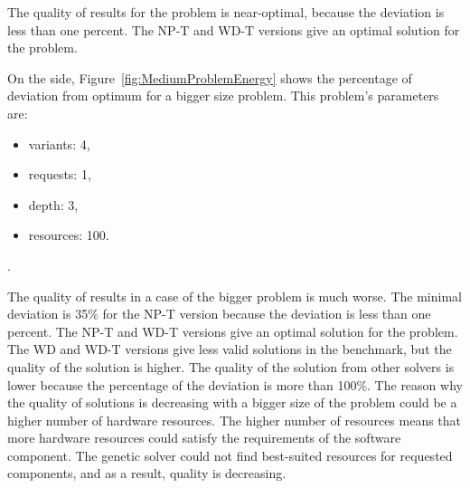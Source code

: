 The quality of results for the problem is near-optimal, because the deviation is less than one percent. The NP-T and WD-T versions give an optimal solution for the problem.

On the side, Figure~\ref{fig:MediumProblemEnergy} shows the percentage of deviation from optimum for a bigger size problem. This problem's parameters are:
\begin{itemize}
	\item variants: 4,
	\item requests: 1,
	\item depth: 3,
	\item resources: 100.
\end{itemize}.

The quality of results in a case of the bigger problem is much worse. The minimal deviation is 35\% for the NP-T version because the deviation is less than one percent. The NP-T and WD-T versions give an optimal solution for the problem. The WD and WD-T versions give less valid solutions in the benchmark, but the quality of the solution is higher. The quality of the solution from other solvers is lower because the percentage of the deviation is more than 100\%. The reason why the quality of solutions is decreasing with a bigger size of the problem could be a higher number of hardware resources. The higher number of resources means that more hardware resources could satisfy the requirements of the software component. The genetic solver could not find best-suited resources for requested components, and as a result, quality is decreasing. 


